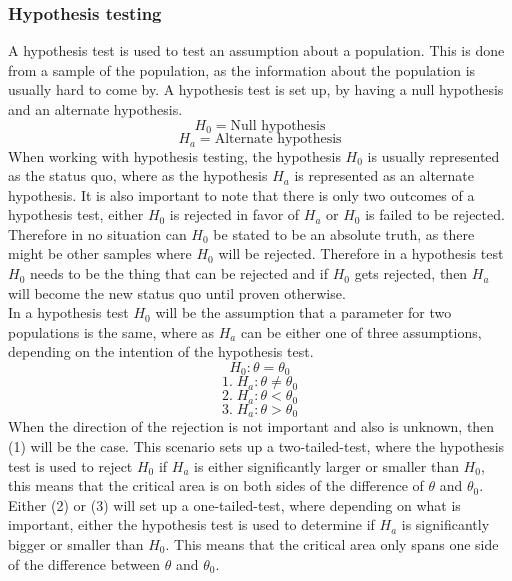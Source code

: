 \subsubsection{Hypothesis testing}
A hypothesis test is used to test an assumption about a population. This is done from a sample of the population, as the information about the population is usually hard to come by. A hypothesis test is set up, by having a null hypothesis and an alternate hypothesis.
$$H_0 = \text{Null hypothesis}$$
$$H_a = \text{Alternate hypothesis}$$
When working with hypothesis testing, the hypothesis $H_0$ is usually represented as the status quo, where as the hypothesis $H_a$ is represented as an alternate hypothesis. It is also important to note that there is only two outcomes of a hypothesis test, either $H_0$ is rejected in favor of $H_a$ or $H_0$ is failed to be rejected. Therefore in no situation can $H_0$ be stated to be an absolute truth, as there might be other samples where $H_0$ will be rejected. Therefore in a hypothesis test $H_0$ needs to be the thing that can be rejected and if $H_0$ gets rejected, then $H_a$ will become the new status quo until proven otherwise.\\
In a hypothesis test $H_0$ will be the assumption that a parameter for two populations is the same, where as $H_a$ can be either one of three assumptions, depending on the intention of the hypothesis test.
$$H_0: \theta = \theta_0$$
$$1.\;H_a: \theta \neq \theta_0$$
$$2.\;H_a: \theta < \theta_0$$
$$3.\;H_a: \theta > \theta_0$$
When the direction of the rejection is not important and also is unknown, then (1) will be the case. This scenario sets up a two-tailed-test, where the hypothesis test is used to reject $H_0$ if $H_a$ is either significantly larger or smaller than $H_0$, this means that the critical area is on both sides of the difference of $\theta$ and $\theta_0$. Either (2) or (3) will set up a one-tailed-test, where depending on what is important, either the hypothesis test is used to determine if $H_a$ is significantly bigger or smaller than $H_0$. This means that the critical area only spans one side of the difference between $\theta$ and $\theta_0$.\\


